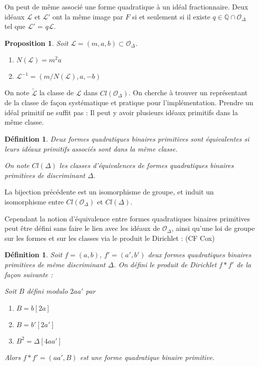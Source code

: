 \documentclass{article}
\newcommand{\Q}[0]{\mathbb{Q}}
\newcommand{\OR}[0]{\mathcal{O}}
\newcommand{\LR}[0]{\mathcal{L}}
\newcommand{\CL}[0]{\tilde{\LR}}
\newtheorem{Prop}[The]{Proposition}
\newtheorem{Def}[The]{Définition}
\begin{document}
On peut de même associé une forme quadratique à un idéal fractionnaire. Deux idéaux $\LR$ et $\LR'$ ont la même image par $F$ si et seulement si il existe $q\in\Q\cap\OR_{\Delta}$ tel que $\LR'$ = $q\LR$. 

\begin{Prop}
	Soit $\LR = (m,a,b)\subset\OR_{\Delta}$. 
	\begin{enumerate}
		\item $N(\LR) = m^2a$
		\item $\LR^{-1} = (m/N(\LR),a,-b)$
	\end{enumerate}
\end{Prop}

On note $\CL$ la classe de $\LR$ dans $Cl(\OR_{\Delta})$. On cherche à trouver un représentant de la classe de façon systématique et pratique pour l'implémentation. Prendre un idéal primitif ne suffit pas : Il peut y avoir plusieurs idéaux primitifs dans la même classe. 

\begin{Def}
	Deux formes quadratiques binaires primitives sont équivalentes si leurs idéaux primitifs associés sont dans la même classe.
	
	On note $Cl(\Delta)$ les classes d'équivalences de formes quadratiques binaires primitives de discriminant $\Delta$.
\end{Def}

La bijection précédente est un isomorphisme de groupe, et induit un isomorphisme entre $Cl(\OR_{\Delta})$ et $Cl(\Delta)$. 

Cependant la notion d'équivalence entre formes quadratiques binaires primitives peut être défini sans faire le lien avec les idéaux de $\OR_{\Delta}$, ainsi qu'une loi de groupe sur les formes et sur les classes via le produit le Dirichlet : (CF Cox)

\begin{Def}
	Soit $f = (a,b)$, $f' = (a', b')$ deux formes quadratiques binaires primitives de même discriminant $\Delta$. On défini le produit de Dirichlet $f*f'$ de la façon suivante :
	
	Soit $B$ défini modulo $2aa'$ par
	
	\begin{enumerate}
		\item $B = b [2a]$
		\item $B = b' [2a']$
		\item $B^2 = \Delta [4aa']$
	\end{enumerate}
	
	Alors $f*f' = (aa', B)$ est une forme quadratique binaire primitive.
\end{Def}
\end{document}
